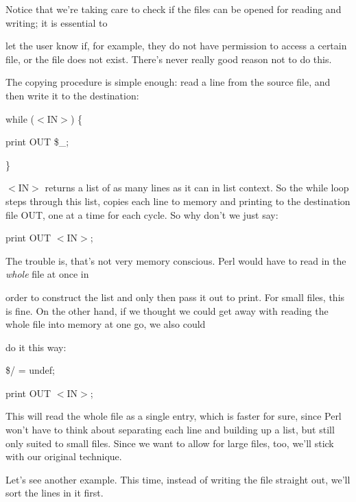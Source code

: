 \documentclass[a4paper,11pt]{book}
\begin{document}
\noindent Notice that we're taking care to check if the files can be opened for reading and writing; it is essential to

\noindent let the user know if, for example, they do not have permission to access a certain file, or the file does not exist. There's never really good reason not to do this.

\noindent 

\noindent The  copying  procedure  is  simple  enough:  read  a  line  from  the  source  file,  and  then  write  it  to the destination:

\noindent 

\noindent while ($<$IN$>$) \{

\noindent print OUT \$\_;

\noindent \}

\noindent 

\noindent $<$IN$>$ returns a list of as many lines as it can in list context. So the while loop steps through this list, copies each line to memory and printing to the destination file OUT, one at a time for each cycle. So why don't we just say:

\noindent 

\noindent print OUT $<$IN$>$;

\noindent 

\noindent 

\noindent The trouble is, that's not very memory conscious. Perl would have to read in the \textit{whole }file at once in

\noindent order to construct the list and only then pass it out to print. For small files, this is fine. On the other hand, if we thought we could get away with reading the whole file into memory at one go, we also could

\noindent do it this way:

\noindent 

\noindent 

\noindent \$/ = undef;

\noindent print OUT $<$IN$>$;

\noindent 

\noindent This will read the whole file as a single entry, which is faster for sure, since Perl won't have to think about separating each line and building up a list, but still only suited to small files. Since we want to allow for large files, too, we'll stick with our original technique.

\noindent 

\noindent Let's see another example. This time, instead of writing the file straight out, we'll sort the lines in it first.
\end{document}
